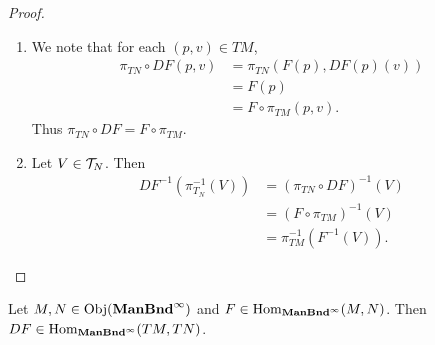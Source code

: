 \documentclass{book}
\begin{document}
\begin{proof}\
	\begin{enumerate}
		\item We note that for each $(p,v) \in TM$, 
		\begin{align*}
			\pi_{TN} \circ DF(p, v)
			& = \pi_{TN} (F(p), DF(p)(v)) \\
			& = F(p) \\
			& = F \circ \pi_{TM}(p,v).
		\end{align*}
		Thus $\pi_{TN} \circ DF = F \circ \pi_{TM}$.
		\item Let $V \in \mathcal{T}_N$. Then 
		\begin{align*}
			DF^{-1}(\pi_{T_N}^{-1}(V))
			& = (\pi_{TN} \circ DF)^{-1}(V) \\
			& = ( F \circ \pi_{TM})^{-1}(V) \\
			& = \pi_{TM}^{-1}(F^{-1}(V)).
		\end{align*}
	\end{enumerate}
\end{proof}

\begin{ex}
	Let $M,N \in \operatorname{Obj}(\operatorname*{\text{\textbf{ManBnd}}^{\infty}})$ and $F \in \operatorname{Hom}_{\operatorname*{\text{\textbf{ManBnd}}^{\infty}}}(M, N)$. Then $DF \in \operatorname{Hom}_{\operatorname*{\text{\textbf{ManBnd}}^{\infty}}}(TM, TN)$.
\end{ex}
\end{document}
